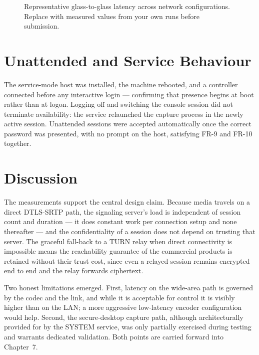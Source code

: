 \begin{figure}[H]
\centering
{}
\caption{Representative glass-to-glass latency across network configurations.
Replace with measured values from your own runs before submission.}
\label{fig:latency}
\end{figure}

\section{Unattended and Service Behaviour}

The service-mode host was installed, the machine rebooted, and a controller
connected before any interactive login --- confirming that presence begins at
boot rather than at logon. Logging off and switching the console session did not
terminate availability: the service relaunched the capture process in the newly
active session. Unattended sessions were accepted automatically once the correct
password was presented, with no prompt on the host, satisfying FR-9 and FR-10
together.

\section{Discussion}

The measurements support the central design claim. Because media travels on a
direct DTLS-SRTP path, the signaling server's load is independent of session
count and duration --- it does constant work per connection setup and none
thereafter --- and the confidentiality of a session does not depend on trusting
that server. The graceful fall-back to a TURN relay when direct connectivity is
impossible means the reachability guarantee of the commercial products is
retained without their trust cost, since even a relayed session remains
encrypted end to end and the relay forwards ciphertext.

Two honest limitations emerged. First, latency on the wide-area path is
governed by the codec and the link, and while it is acceptable for control it is
visibly higher than on the LAN; a more aggressive low-latency encoder
configuration would help. Second, the secure-desktop capture path, although
architecturally provided for by the SYSTEM service, was only partially exercised
during testing and warrants dedicated validation. Both points are carried
forward into Chapter~7.
